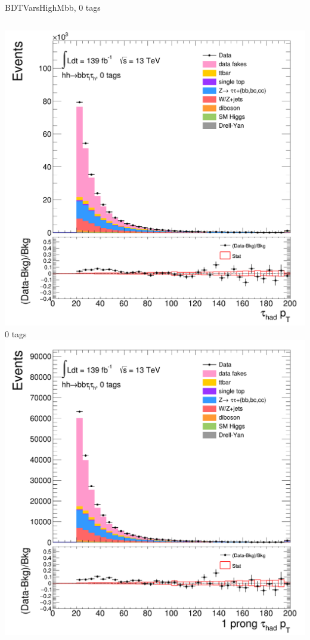 \begin{frame}{BDTVarsHighMbb, 0 tags}
  \begin{columns}[c]
    \centering\includegraphics[width=\textwidth]{C_0tag2pjet_0ptv_TauPt}\\
    0 tags
    \centering\includegraphics[width=\textwidth]{C_0tag2pjet_0ptv_TauPt1P}\\

\end{columns}
\end{frame}
